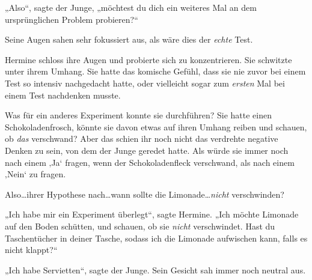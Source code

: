 „Also“, sagte der Junge, „möchtest du dich ein weiteres Mal an dem ursprünglichen Problem probieren?“

Seine Augen sahen sehr fokussiert aus, als wäre dies der \emph{echte} Test.

Hermine schloss ihre Augen und probierte sich zu konzentrieren. Sie schwitzte unter ihrem Umhang. Sie hatte das komische Gefühl, dass sie nie zuvor bei einem Test so intensiv nachgedacht hatte, oder vielleicht sogar zum \emph{ersten} Mal bei einem Test nachdenken musste.

Was für ein anderes Experiment konnte sie durchführen? Sie hatte einen Schokoladenfrosch, könnte sie davon etwas auf ihren Umhang reiben und schauen, ob \emph{das} verschwand? Aber das schien ihr noch nicht das verdrehte negative Denken zu sein, von dem der Junge geredet hatte. Als würde sie immer noch nach einem ‚Ja‘ fragen, wenn der Schokoladenfleck verschwand, als nach einem ‚Nein‘ zu fragen.

Also…ihrer Hypothese nach…wann sollte die Limonade…\emph{nicht} verschwinden?

„Ich habe mir ein Experiment überlegt“, sagte Hermine. „Ich möchte Limonade auf den Boden schütten, und schauen, ob sie \emph{nicht} verschwindet. Hast du Taschentücher in deiner Tasche, sodass ich die Limonade aufwischen kann, falls es nicht klappt?“

„Ich habe Servietten“, sagte der Junge. Sein Gesicht sah immer noch neutral aus.

